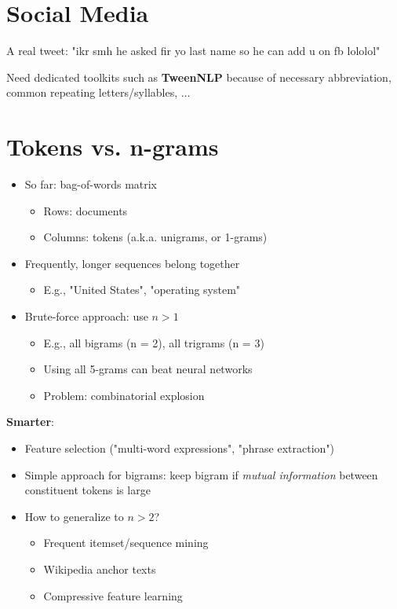 \documentclass[11pt]{article}
\begin{document}
\vspace{0.5cm}
\section*{Social Media}

A real tweet: "ikr smh he asked fir yo last name so he can add u on fb lololol"

Need dedicated toolkits such as \textbf{TweenNLP} because of necessary abbreviation, common repeating letters/syllables, ...

\section*{Tokens vs. n-grams}
\begin{itemize}
	\item So far: bag-of-words matrix
		\begin{itemize}
			\item Rows: documents
			\item Columns: tokens (a.k.a. unigrams, or 1-grams)
		\end{itemize}
	\item Frequently, longer sequences belong together
		\begin{itemize}
			\item E.g., "United States", "operating system"
		\end{itemize}
	\item Brute-force approach: use $n > 1$
		\begin{itemize}
			\item E.g., all bigrams (n = 2), all trigrams (n = 3)
			\item Using all 5-grams can beat neural networks
			\item Problem: combinatorial explosion
		\end{itemize}
\end{itemize}
\textbf{Smarter}:
\begin{itemize}
	\item Feature selection ("multi-word expressions", "phrase extraction")
	\item Simple approach for bigrams: keep bigram if \textit{mutual information} between constituent tokens is large
	\item How to generalize to $n > 2$? 
		\begin{itemize}
			\item Frequent itemset/sequence mining
			\item Wikipedia anchor texts
			\item Compressive feature learning
		\end{itemize}
\end{itemize}
\end{document}
